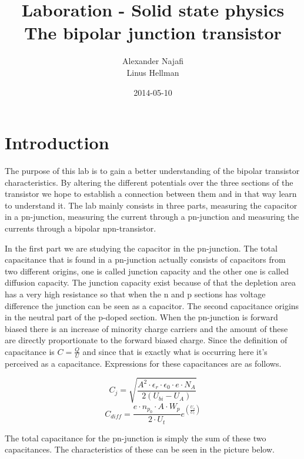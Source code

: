 \documentclass[a4paper]{article}
\title{Laboration - Solid state physics\\ The bipolar junction transistor}
\author{Alexander Najafi \\ Linus Hellman}
\date{2014-05-10}
\begin{document}
\maketitle
\thispagestyle{empty}
\newpage

\tableofcontents
\newpage
\section{Introduction}
The purpose of this lab is to gain a better understanding of the bipolar transistor characteristics. By altering the different potentials over the three sections of the transistor we hope to establish a connection between them and in that way learn to understand it. The lab mainly consists in three parts, measuring the capacitor in a pn-junction, measuring the current through a pn-junction and measuring the currents through a bipolar npn-transistor.

In the first part we are studying the capacitor in the pn-junction. The total capacitance that is found in a pn-junction actually consists of capacitors from two different origins, one is called junction capacity and the other one is called diffusion capacity. The junction capacity exist because of that the depletion area has a very high resistance so that when the n and p sections has voltage difference the junction can be seen as a capacitor. The second capacitance origins in the neutral part of the p-doped section. When the pn-junction is forward biased there is an increase of minority charge carriers and the amount of these are directly proportionate to the forward biased charge. Since the definition of capacitance is $C=\frac{Q}{U}$ and since that is exactly what is occurring here it's perceived as a capacitance. Expressions for these capacitances are as follows.

\begin{equation}
C_j=\sqrt{\frac{A^2{\cdot}\epsilon_r{\cdot}\epsilon_0{\cdot}e{\cdot}N_A}{2(U_{bi}-U_A)}}
\end{equation}
\begin{equation}
C_{diff}=\frac{e{\cdot}n_{p_0}{\cdot}A{\cdot}W_p}{2{\cdot}U_t}e^{(\frac{U_a}{U_t})}
\end{equation}

The total capacitance for the pn-junction is simply the sum of these two capacitances. The characteristics of these can be seen in the picture below.
\end{document}
